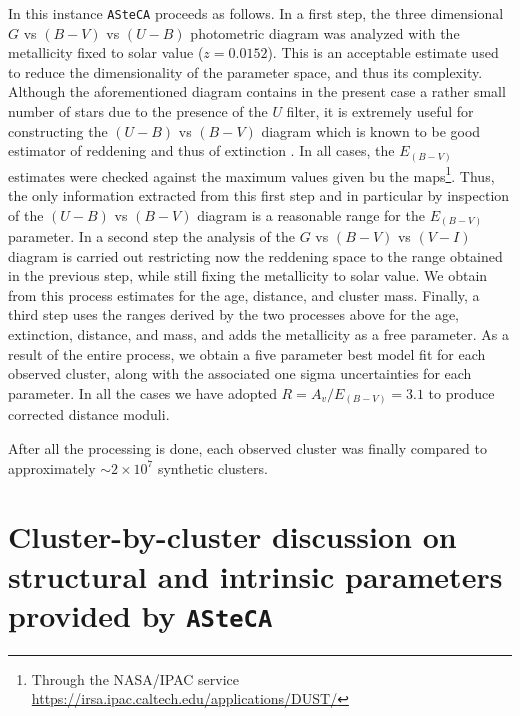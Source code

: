 \documentclass[draft]{aa}
\begin{document}
In this instance \texttt{ASteCA} proceeds as follows.
In a first step, the three dimensional $G$ vs $(B-V)$ vs $(U-B)$ photometric
diagram was analyzed with the metallicity fixed to solar value ($z = 0.0152$).
This is an acceptable estimate used to reduce the dimensionality of the
parameter space, and thus its complexity. Although the aforementioned diagram
contains in the present case a rather small number of stars due to the presence
of the $U$ filter, it is extremely useful for constructing the $(U-B)$ vs $
(B-V)$ diagram which is known to be good estimator of reddening and thus of
extinction \citep{Vazquez2008}.
In all cases, the $E_{(B-V)}$ estimates were checked against the maximum values
given bu the \cite{Schlafly_2011} maps\footnote{Through the NASA/IPAC service
\url{https://irsa.ipac.caltech.edu/applications/DUST/}}.
Thus, the only information extracted from this first step and in particular by
inspection of the $(U-B)$ vs $(B-V)$ diagram is a reasonable range for
the $E_{(B-V)}$ parameter.
%
In a second step the analysis of the $G$ vs $(B-V)$ vs $(V-I)$ diagram is
carried out restricting now the reddening space to the range
obtained in the previous step, while still fixing the metallicity to solar
value. We obtain from this process estimates for the age, distance, and cluster
mass.
%
Finally, a third step uses the ranges derived by the two processes above for the
age, extinction, distance, and mass, and adds the metallicity as a free
parameter. As a result of the entire process, we obtain a five parameter best
model fit for each observed cluster, along with the associated one sigma
uncertainties for each parameter. In all the cases we have adopted $R =
A_v/E_{(B-V)} = 3.1$ to produce corrected distance moduli.

After all the processing is done, each observed cluster was finally compared to
approximately $\sim2\times10^7$ synthetic clusters.





\section{Cluster-by-cluster discussion on structural and intrinsic parameters
provided by \texttt{ASteCA}}
\label{sec:cluster_discuss}
\end{document}
